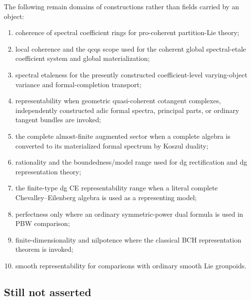 The following remain domains of constructions rather than fields carried by an
object:
\begin{enumerate}
    \item coherence of spectral coefficient rings for pro-coherent
    partition-Lie theory;
    \item local coherence and the qcqs scope used for the coherent global
    spectral-etale coefficient system and global materialization;
    \item spectral etaleness for the presently constructed coefficient-level
    varying-object variance and formal-completion transport;
    \item representability when geometric quasi-coherent cotangent complexes,
    independently constructed adic formal spectra, principal parts, or
    ordinary tangent bundles are invoked;
    \item the complete almost-finite augmented sector when a complete algebra
    is converted to its materialized formal spectrum by Koszul duality;
    \item rationality and the boundedness/model range used for dg
    rectification and dg representation theory;
    \item the finite-type dg CE representability range when a literal complete
    Chevalley--Eilenberg algebra is used as a representing model;
    \item perfectness only where an ordinary symmetric-power dual formula is
    used in PBW comparison;
    \item finite-dimensionality and nilpotence where the classical BCH
    representation theorem is invoked;
    \item smooth representability for comparisons with ordinary smooth Lie
    groupoids.
\end{enumerate}

\subsection{Still not asserted}

